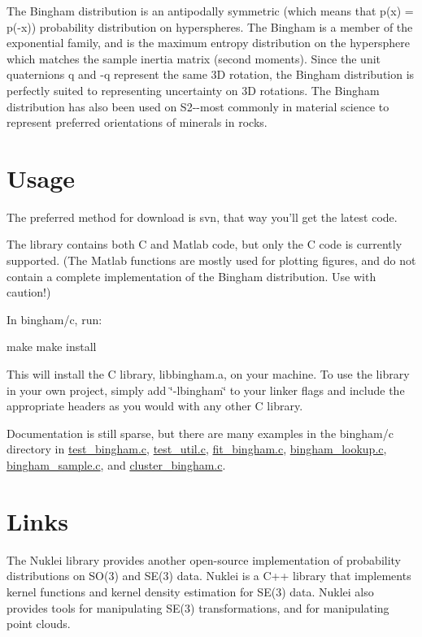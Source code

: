 The Bingham distribution is an antipodally symmetric (which means that p(x) = p(-\/x)) probability distribution on hyperspheres. The Bingham is a member of the exponential family, and is the maximum entropy distribution on the hypersphere which matches the sample inertia matrix (second moments). Since the unit quaternions q and -\/q represent the same 3D rotation, the Bingham distribution is perfectly suited to representing uncertainty on 3D rotations. The Bingham distribution has also been used on S2-\/-\/most commonly in material science to represent preferred orientations of minerals in rocks.\hypertarget{index_usage}{}\section{Usage}\label{index_usage}
The preferred method for download is svn, that way you'll get the latest code.

The library contains both C and Matlab code, but only the C code is currently supported. (The Matlab functions are mostly used for plotting figures, and do not contain a complete implementation of the Bingham distribution. Use with caution!)

In bingham/c, run:


\begin{DoxyCode}
make
make install
\end{DoxyCode}


This will install the C library, libbingham.a, on your machine. To use the library in your own project, simply add \char`\"{}-\/lbingham\char`\"{} to your linker flags and include the appropriate headers as you would with any other C library.

Documentation is still sparse, but there are many examples in the bingham/c directory in \hyperlink{test__bingham_8c}{test\_\-bingham.c}, \hyperlink{test__util_8c}{test\_\-util.c}, \hyperlink{fit__bingham_8c}{fit\_\-bingham.c}, \hyperlink{bingham__lookup_8c}{bingham\_\-lookup.c}, \hyperlink{bingham__sample_8c}{bingham\_\-sample.c}, and \hyperlink{cluster__bingham_8c}{cluster\_\-bingham.c}.\hypertarget{index_links}{}\section{Links}\label{index_links}
The Nuklei library provides another open-\/source implementation of probability distributions on SO(3) and SE(3) data. Nuklei is a C++ library that implements kernel functions and kernel density estimation for SE(3) data. Nuklei also provides tools for manipulating SE(3) transformations, and for manipulating point clouds. 